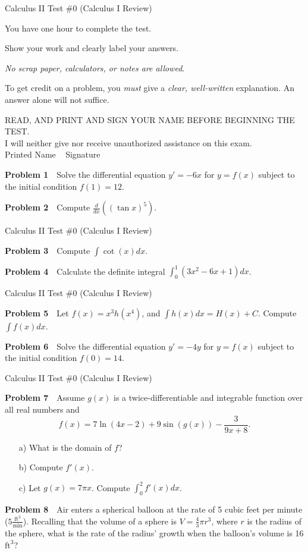 \documentclass[10pt]{article}
\newcommand{\prob}[1]{\vspace{10mm} \noindent \textbf{Problem #1} \,\,}
\newcommand{\header}{
\begin{center}
Calculus II Test \#0 (Calculus I Review)
\end{center}

\vspace{2mm}

}
\newcommand{\intro}{
\noindent You have one hour to complete the test.

\noindent Show your work and clearly label your answers. 

\noindent\emph{No scrap paper, calculators, or notes are allowed}. 

\noindent To get credit on a problem, you \emph{must} give a \emph{clear, well-written} explanation. An answer alone will not suffice.

\bigskip

\noindent READ, AND PRINT AND SIGN YOUR NAME BEFORE BEGINNING THE TEST. \\
I will neither give nor receive unauthorized assistance on this exam. \\
Printed Name \underline{\hspace{50mm}} \,\,\, Signature \underline{\hspace{50mm}}
}
\begin{document}


\header

\intro

\vspace{20mm}

\prob{1} Solve the differential equation $y' = -6 x$ for $y = f(x)$ subject to the initial condition $f(1) = 12$.

\vspace{70mm}

\prob{2} Compute $\frac{d}{dx} ((\tan x)^{ 5 })$.

\pagebreak 

\header

\prob{3} Compute $\int \cot(x) dx$.

\vspace{90mm}

\prob{4} Calculate the definite integral $\int_{ 0 }^{ 1 } (3 x^2  -6 x + 1) dx$. 

\pagebreak

\header

\prob{5} Let $f(x) = x^{ 3 } h(x^{ 4 })$, and $\int h(x) dx = H(x) + C$. Compute $\int f(x) dx$.

\vspace{90mm}

\prob{6} Solve the differential equation $y' = -4 y $ for $y = f(x)$ subject to the initial condition $f(0) = 14 $.

\pagebreak

\header

\prob{7}  Assume $g(x)$ is a twice-differentiable and integrable function over all real numbers and 
\[ f(x) = 7 \ln(4x-2) + 9 \sin( g(x) ) - \frac{3}{9x + 8} .\]

\begin{itemize}
\item[a) ] What is the domain of $f$?
\item[b) ] Compute $f'(x)$. 
\item[c) ] Let $g(x) = 7 \pi x$. Compute $\int_{ 0 }^{ 2 } f'(x) dx$.
\end{itemize}

\vspace{90mm}

\prob{8} Air enters a spherical balloon at the rate of 5 cubic feet per minute 
($5 \frac{\text{ft}^3}{\text{min}}$). 
Recalling that the volume of a sphere is $V = \frac{4}{3} \pi r^3$, 
where $r$ is the radius of the sphere, what is the rate of the radius' 
growth when the balloon's volume is 16 $\text{ft}^3$?
\end{document}
